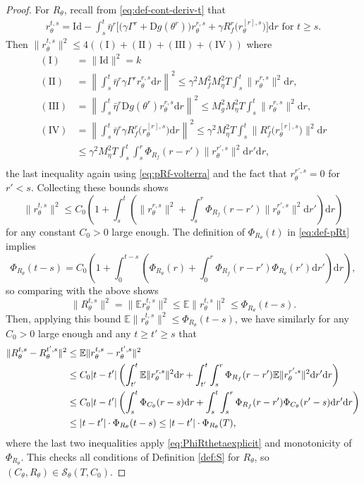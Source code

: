\documentclass[11pt,letterpaper,reqno]{amsart}
\theoremstyle{definition}
\def\d{\mathrm{d}}
\def\D{\mathrm{D}}
\def\E{\mathbb{E}}
\def\Id{\mathrm{Id}}
\def\Ct{C_\theta}
\def\Rt{R_\theta}
\def\pCt{\Phi_{\Ct}}
\def\pRt{\Phi_{\Rt}}
\def\nI{(\mathrm{I})}
\def\nII{(\mathrm{II})}
\def\nIII{(\mathrm{III})}
\def\nIV{(\mathrm{IV})}
\newcommand{\norm}[1]{\|#1\|}
\begin{document}
\begin{proof}
For $R_\theta$, recall from \eqref{eq:def-cont-deriv-t} that
\begin{align}\label{eq:rthetarestate}
r_\theta^{t,s}=\Id-\int_s^t \bar\eta^r\bigg[\Big({\gamma}\Gamma^r+\D
g(\theta^r)\Big)r_\theta^{r,s}+{\gamma}
R_f^r\Big(r_\theta^{[r],s}\Big)\bigg]\d r \text{ for } t \geq s.
\end{align}
Then $\|r_\theta^{t,s}\|^2 \leq 4(\nI+\nII+\nIII+\nIV)$ where
\begin{align*}
\nI&=\|\Id\|^2=k\\
\nII&=\left\|\int_s^t \bar\eta^r\gamma\Gamma^r r_\theta^{r,s}\d
r\right\|^2
\leq \gamma^2M_f^2M_\eta^2T\int_s^t \|r_\theta^{r,s}\|^2 \d r,\\
\nIII&=\left\|\int_s^t \bar\eta^r \D g(\theta^r)r_\theta^{r,s}\d
r\right\|^2
\leq M_g^2 M_\eta^2 T\int_s^t \|r_\theta^{r,s}\|^2 \d r,\\
\nIV&=\left\|\int_s^t \bar\eta^r \gamma R_f^r\Big(r_\theta^{[r],s}\Big)\d
r\right\|^2
\leq \gamma^2 M_\eta^2 T\int_s^t
\Big\|R_f^r\Big(r_\theta^{[r],s}\Big)\Big\|^2 \d r\\
&\leq \gamma^2 M_\eta^2 T\int_s^t \int_s^r \Phi_{R_f}(r-r')
\|r_\theta^{r',s}\|^2 \d r'\d r,\\
\end{align*}
the last inequality again using \eqref{eq:pRf-volterra} and the fact that
$r_\theta^{r',s}=0$ for $r'<s$. Collecting these bounds shows
\[\|r_\theta^{t,s}\|^2
\leq C_0\left(1+\int_s^t \left(\norm{r_\theta^{r,s}}^2
+\int_s^r \Phi_{R_f}(r-r')\|r_\theta^{r',s}\|^2\d r'\right) \d r\right)\]
for any constant $C_0>0$ large enough.
The definition of $\Phi_{R_\theta}(t)$ in \eqref{eq:def-pRt} implies
\begin{equation}\label{eq:PhiRthetaexplicit}
\Phi_{R_\theta}(t-s)=C_0\left(1+\int_0^{t-s}\left(
\Phi_{R_\theta}(r)+\int_0^r \Phi_{R_f}(r-r')\Phi_{R_\theta}(r')\d
r'\right)\d r\right),
\end{equation}
so comparing with the above shows
\[\|R_\theta^{t,s}\|^2=\|\E r_\theta^{t,s}\|^2\leq \E\|r_\theta^{t,s}\|^2
\leq \Phi_{R_\theta}(t-s).\]
Then, applying this bound
$\E\|r_\theta^{t,s}\|^2 \leq \Phi_{R_\theta}(t-s)$,
we have similarly for any $C_0>0$ large enough and any $t \geq t' \geq s$ that
\begin{align}
\|R_\theta^{t,s}-R_\theta^{t',s}\|^2
&\leq \E\|r_\theta^{t,s}-r_\theta^{t',s}\|^2\notag\\
&\leq C_0|t-t'|\left(\int_{t'}^t \E\|r_\theta^{r,s}\|^2 \d r
+\int_{t'}^t \int_s^r \Phi_{R_f}(r-r')\E \|r_\theta^{r',s}\|^2 \d r' \d
r\right)\notag\\
&\leq C_0|t-t'|\left(\int_s^t \pCt(r-s)\d r
+\int_s^t \int_s^r \Phi_{R_f}(r-r')\pCt(r'-s)\d r' \d
r\right)\notag\\
&\leq |t-t'| \cdot \pRt(t-s) \leq |t-t'| \cdot \pRt(T),\label{eq:Rcontbound}
\end{align}
where the last two inequalities apply \eqref{eq:PhiRthetaexplicit} and
monotonicity of $\pRt$.
This checks all conditions of Definition \ref{def:S} for $R_\theta$, so
$(\Ct,\Rt) \in {\mathcal{S}}_\theta(T,C_0)$.


\end{proof}
\end{document}
